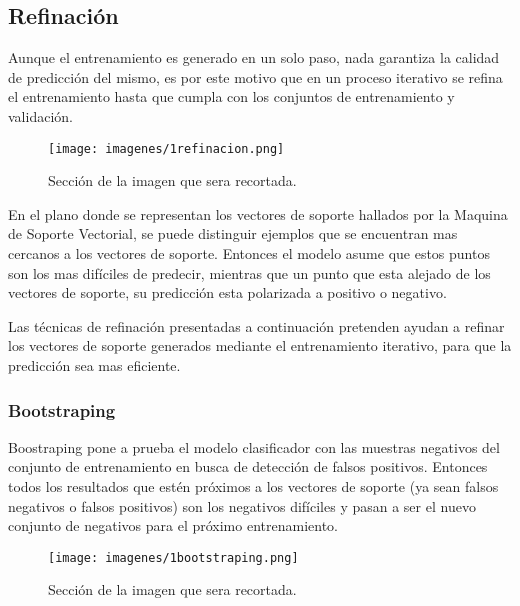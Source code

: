 \subsection{Refinación}

\noindent Aunque el entrenamiento es generado en un solo paso, nada garantiza la calidad de predicción del mismo, es por este motivo que en un proceso iterativo se refina el entrenamiento hasta que cumpla con los conjuntos de entrenamiento y validación.

\begin{figure}[H]
\centering
{\texttt{[image: imagenes/1refinacion.png]}}
\caption{Sección de la imagen que sera recortada.}
\label{fig:sectorRecorte}
\end{figure}

\noindent En el plano donde se representan los vectores de soporte hallados por la Maquina de Soporte Vectorial, se puede distinguir ejemplos que se encuentran mas cercanos a los vectores de soporte. Entonces el modelo asume que estos puntos son los mas difíciles de predecir, mientras que un punto que esta alejado de los vectores de soporte, su predicción esta polarizada a positivo o negativo.

\noindent Las técnicas de refinación presentadas a continuación pretenden ayudan a refinar los vectores de soporte generados mediante el entrenamiento iterativo, para que la predicción sea mas eficiente.

\subsubsection{Bootstraping}

\noindent Boostraping pone a prueba el modelo clasificador con las muestras negativos del conjunto de entrenamiento en busca de detección de falsos positivos. Entonces todos los resultados que estén próximos a los vectores de soporte (ya sean falsos negativos o falsos positivos) son los negativos difíciles y pasan a ser el nuevo conjunto de negativos para el próximo entrenamiento.

\begin{figure}[H]
\centering
{\texttt{[image: imagenes/1bootstraping.png]}}
\caption{Sección de la imagen que sera recortada.}
\label{fig:sectorRecorte}
\end{figure}

